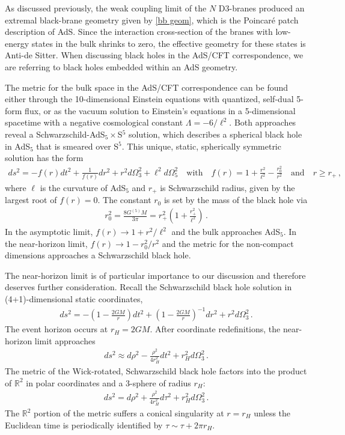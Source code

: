 \documentclass[../PhD.tex]{subfiles}
\begin{document}
As discussed previously, the weak coupling limit of the $N$ D3-branes produced an extremal black-brane geometry given by \eqref{bb geom}, which is the Poincar\'e patch description of AdS. Since the interaction cross-section of the branes with low-energy states in the bulk shrinks to zero, the effective geometry for these states is Anti-de Sitter. When discussing black holes in the AdS/CFT correspondence, we are referring to black holes embedded within an AdS geometry. 

The metric for the bulk space in the AdS/CFT correspondence can be found either through the 10-dimensional Einstein equations with quantized, self-dual 5-form flux, or as the vacuum solution to Einstein's equations in a 5-dimensional spacetime with a negative cosmological constant $\Lambda = -6/\ell^2$. Both approaches reveal a Schwarzschild-AdS$_5 \times$S$^5$ solution, which describes a spherical black hole in AdS$_5$ that is smeared over S$^5$. This unique, static, spherically symmetric solution has the form
\begin{align}
\label{AdS5xS5 bh}
ds^2 = -f(r) dt^2 + \frac{1}{f(r)} dr^2 + r^2 d\Omega^2_3 + \ell^2 d\Omega_5^2 \quad \text{with} \quad f(r) = 1 + \frac{r^2}{\ell^2} - \frac{r_0^2}{r^2} \quad \text{and} \quad r \geq r_+ \, ,
\end{align}
where $\ell$ is the curvature of AdS$_5$ and $r_+$ is Schwarzschild radius, given by the largest root of $f(r)= 0$. The constant $r_0$ is set by the mass of the black hole via
\begin{align}
r_0^2 = \frac{8 G^{(5)} M}{3\pi} = r_+^2 \left( 1 + \frac{r_+^2}{\ell^2} \right) \, .
\end{align}
In the asymptotic limit, $f(r) \to 1 + r^2 / \ell^2$ and the bulk approaches AdS$_5$. In the near-horizon limit, $f(r) \to 1 - r_0^2/r^2$ and the metric for the non-compact dimensions approaches a Schwarzschild black hole.

The near-horizon limit is of particular importance to our discussion and therefore deserves further consideration. Recall the Schwarzschild black hole solution in (4+1)-dimensional static coordinates,
\begin{align}
ds^2 = -\left( 1 - \frac{2GM}{r} \right) dt^2 + \left(1- \frac{2GM}{r}\right)^{-1} dr^2 + r^2 d\Omega_3^2 \, .
\end{align}
The event horizon occurs at $r_H = 2GM$. After coordinate redefinitions, the near-horizon limit approaches
\begin{align}
ds^2 \approx d\rho^2 - \frac{\rho^2}{4r_H^2}dt^2 + r_H^2 d\Omega_3^2 \, .
\end{align}
The metric of the Wick-rotated, Schwarzschild black hole factors into the product of $\mathbb R^2$ in polar coordinates and a 3-sphere of radius $r_H$:
\begin{align}
\label{near-horizon thermal bh}
ds^2 = d\rho^2 + \frac{\rho^2}{4r_H^2} d\tau^2 + r_H^2 d\Omega^2_3 \, .
\end{align}
The $\mathbb R^2$ portion of the metric suffers a conical singularity at $r=r_H$ unless the Euclidean time is periodically identified by $\tau \sim \tau + 2\pi r_H$.
\end{document}
